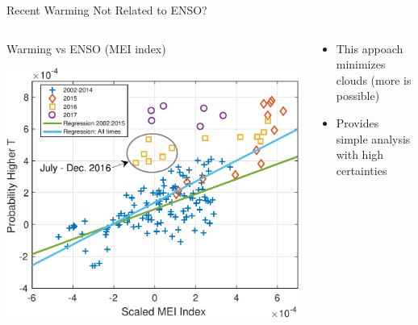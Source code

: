 \documentclass[10pt,t]{beamer}
\begin{document}
\begin{frame}{Recent Warming Not Related to ENSO?}
  \begin{columns}
    \begin{column}{0.50\textwidth}
        \vspace{-0.2in}
      \begin{block}{\footnotesize Warming vs ENSO (MEI index)}
        \vspace{-0.1in}
        \begin{center}
          \includegraphics[width=0.85\linewidth]{./Figs_mei/Pdf/mei_vs_highT_prob_with_regr_v2.pdf}
        \end{center}
      \end{block}
    \end{column}

    \begin{column}{0.50\textwidth}
        \vspace{-0.1in}
        \begin{block}{}
        \small
        \begin{itemize}
        \item This appoach minimizes clouds (more is possible)
        \item Provides simple analysis with high certainties
        \end{itemize}
      \end{block}
    \end{column}
  \end{columns}

\end{frame}
\end{document}
